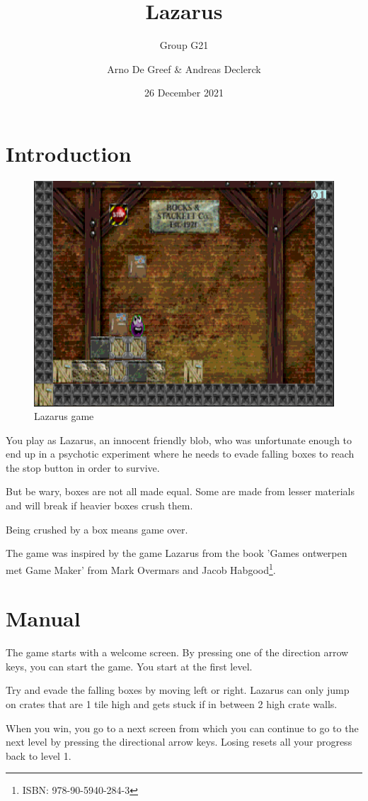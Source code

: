 \documentclass[]{article}
\title{Lazarus}
\subtitle{Group G21}
\author{Arno De Greef \& Andreas Declerck}
\date{26 December 2021}
\begin{document}
\maketitle
\section{Introduction}

\begin{figure}[htpb]
    \centering
    \includegraphics[width=0.6\linewidth]{figures/lazarus_spel.png}
    \caption{Lazarus game}
    \label{fig:lazarus_spel}
\end{figure}

You play as Lazarus, an innocent friendly blob, who was unfortunate 
enough to end up in a psychotic experiment where he needs to evade
falling boxes to reach the stop button in order to survive.

But be wary, boxes are not all made equal. Some are made from lesser 
materials and will break if heavier boxes crush them.

Being crushed by a box means game over.

The game was inspired by the game Lazarus from the book 'Games ontwerpen met
Game Maker' from Mark Overmars and Jacob Habgood\footnote{ISBN:
978-90-5940-284-3}.

\section{Manual}
The game starts with a welcome screen. By pressing one of the direction
arrow keys, you can start the game. You start at the first level.

Try and evade the falling boxes by moving left or right. Lazarus can 
only jump on crates that are 1 tile high and gets stuck if in between
2 high crate walls.

When you win, you go to a next screen from which you can continue to 
go to the next level by pressing the directional arrow keys. Losing 
resets all your progress back to level 1.
\end{document}
